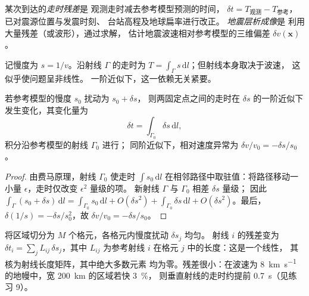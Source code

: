 \begin{definition}\label{def:b3:seismology-imaging:tomography}
某次到达的\emph{走时残差}是
观测走时减去参考模型预测的时间，
$\delta t = T_{\text{观测}} - T_{\text{参考}}$，已对震源位置与发震时刻、
台站高程及地球扁率进行改正。
\emph{地震层析成像}是
利用大量残差（或波形），通过求解，
估计地震波速相对参考模型的三维偏差
$\delta v(\mathbf x)$。
\end{definition}

记慢度为 $s = 1/v$。沿射线 $\Gamma$ 的走时为
$T = \int_\Gamma s\,\mathrm dl$；但射线本身取决于波速，
这似乎使问题呈非线性。
一阶近似下，这一依赖无关紧要。

\begin{proposition}[线性化走时残差]\label{prop:b3:seismology-imaging:linear}
若参考模型的慢度 $s_0$ 扰动为 $s_0 + \delta s$，
则两固定点之间的走时在
$\delta s$ 的一阶近似下发生变化，其变化量为
\[
  \delta t = \int_{\Gamma_0}\delta s\,\mathrm dl ,
\]
积分沿参考模型的射线 $\Gamma_0$ 进行；
同阶近似下，相对速度异常为 $\delta v/v_0 = -\delta s/s_0$。
\end{proposition}

\begin{proof}
由费马原理，射线 $\Gamma_0$ 使走时
$\int s_0\,\mathrm dl$ 在相邻路径中取驻值：将路径移动一小量
$\epsilon$，走时仅改变 $\epsilon^2$ 量级的项。
新射线 $\Gamma$ 与 $\Gamma_0$ 相差 $\delta s$ 量级；
因此 $\int_\Gamma(s_0 + \delta s)\,\mathrm dl = \int_{\Gamma_0}s_0\,\mathrm dl +
O(\delta s^2) + \int_{\Gamma_0}\delta s\,\mathrm dl + O(\delta s^2)$。最后，
$\delta(1/s) = -\delta s/s_0^2$，故 $\delta v/v_0 = -\delta s/s_0$。
\end{proof}

将区域切分为 $M$ 个格元，各格元内慢度扰动 $\delta s_j$ 均匀。
射线 $i$ 的残差变为 $\delta t_i = \sum_j L_{ij}\,\delta s_j$，其中
$L_{ij}$ 为参考射线 $i$ 在格元 $j$ 中的长度：这是一个线性，
其核为射线长度矩阵，其中绝大多数元素
均为零。残差很小：在波速为
\qty{8}{km.s^{-1}} 的地幔中，宽 \qty{200}{km} 的区域若快 \qty{3}{\percent}，
则垂直射线的走时约提前 \qty{0.7}{s}（见练习 9）。

